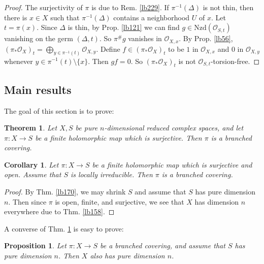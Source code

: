 \documentclass[12pt,b5paper,notitlepage]{report}
\theoremstyle{definition}
\theoremstyle{plain}
\newtheorem{thm}[df]{Theorem}
\newtheorem{pp}[df]{Proposition}
\newtheorem{co}[df]{Corollary}
\newcommand{\scr}{\mathscr}
\newcommand{\Nzd}{\mathrm{Nzd}}
\numberwithin{equation}{section}
\begin{document}
\begin{proof}
The surjectivity of $\pi$ is due to Rem. \ref{lb229}. If $\pi^{-1}(\Delta)$ is not thin, then there is $x\in X$ such that $\pi^{-1}(\Delta)$ contains a neighborhood $U$ of $x$. Let $t=\pi(x)$. Since $\Delta$ is thin, by Prop. \ref{lb121} we can find $g\in\Nzd(\scr O_{S,t})$ vanishing on the germ $(\Delta,t)$. So $\pi^\#g$ vanishes in $\scr O_{X,x}$. By Prop. \ref{lb56}, $(\pi_*\scr O_X)_t=\bigoplus_{y\in\pi^{-1}(t)}\scr O_{X,y}$. Define $f\in (\pi_*\scr O_X)_t$ to be $1$ in $\scr O_{X,x}$ and $0$ in $\scr O_{X,y}$ whenever $y\in\pi^{-1}(t)\setminus\{x\}$. Then $gf=0$. So $(\pi_*\scr O_X)_t$ is not $\scr O_{S,t}$-torsion-free.
\end{proof}



\subsection{Main results}


The goal of this section is to prove:


\begin{thm}\label{lb198}
Let $X,S$ be pure $n$-dimensional reduced complex spaces, and let $\pi:X\rightarrow S$ be a finite holomorphic map which is surjective. Then $\pi$ is a branched covering.
\end{thm}



\begin{co}\label{lb233}
Let $\pi:X\rightarrow S$ be a finite holomorphic map which is surjective and open. Assume that $S$ is locally irreducible. Then $\pi$ is a branched covering.
\end{co}


\begin{proof}
By Thm. \ref{lb170}, we may shrink $S$ and assume that $S$ has pure dimension $n$. Then since $\pi$ is open, finite, and surjective, we see that $X$ has dimension $n$ everywhere due to Thm. \ref{lb158}.
\end{proof}





A converse of Thm. \ref{lb198} is easy to prove:

\begin{pp}
Let $\pi:X\rightarrow S$ be a branched covering, and assume that $S$ has pure dimension $n$. Then $X$ also has pure dimension $n$.
\end{pp}
\end{document}
